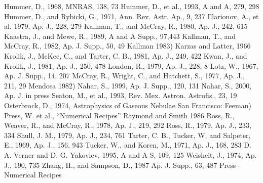 \begin{thebibliography}{25}
	Hummer, D., 1968, MNRAS, 138, 73
	Hummer, D., et al., 1993, A and A,  279, 298
	Hummer, D.,  and Rybicki, G.,  1971, Ann. Rev. Astr. Ap., 9, 237
	Illarionov, A.,  et al. 1979, Ap. J., 228, 279
	Kallman, T.,  and McCray, R., 1980, Ap. J., 242, 615
	Kaastra, J., and Mewe, R., 1989, A and A Supp.,  97,443 
	Kallman, T.,  and McCray, R., 1982, Ap. J. Supp., 50, 49
	Kallman 1983)
	Karzas and Latter, 1966
	Krolik, J., McKee, C., and Tarter, C. B., 1981, Ap. J., 249, 422
	Kwan, J., and Krolik, J., 1981, Ap. J., 250, 478
	London, R.,  1979, Ap. J., 228, 8
	Lotz, W., 1967, Ap. J. Supp., 14, 207
	McCray, R., Wright, C., and Hatchett, S., 1977, Ap. J., 211, 29
	Mendosa 1982)
	Nahar, S., 1999, Ap. J. Supp., 120, 131
	Nahar, S., 2000, Ap. J. in press
	Seaton, M., et al., 1993, Rev. Mex. Astron. Astrofis., 23, 19
	Osterbrock, D.,  1974, Astrophysics of Gaseous Nebulae San Francisco: Feeman)
	Press, W. et al., ``Numerical Recipes'' 
	Raymond and Smith 1986
	Ross, R., Weaver, R.,  and McCray, R., 1978, Ap. J., 219, 292
	Ross, R., 1979, Ap. J., 233, 334
	Shull, J. M., 1979, Ap. J., 234, 761
	Tarter, C. B., Tucker, W,  and Salpeter, E.,  1969, Ap. J., 156, 943
	Tucker, W.,  and Koren, M., 1971, Ap. J., 168, 283
	D. A. Verner and D. G. Yakovlev, 1995, A and A S, 109, 125
	Weisheit, J., 1974, Ap. J., 190, 735
	Zhang, H., and Sampson, D., 1987 Ap. J. Supp., 63, 487
	Press - Numerical Recipes

\end{thebibliography}





